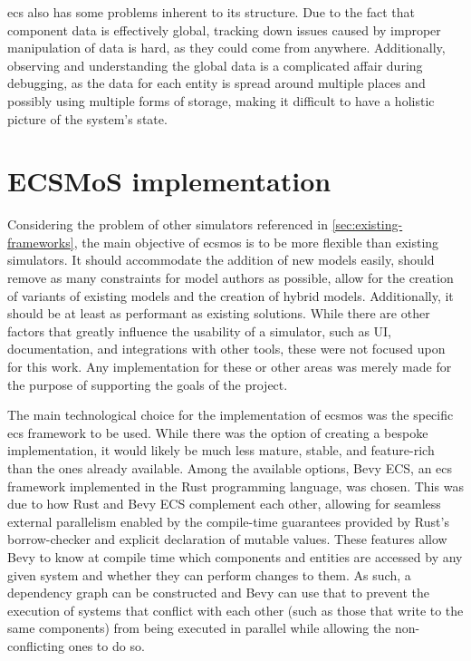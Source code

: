 \documentclass[twoside, 11pt]{article}
\begin{document}
\gls{ecs} also has some problems inherent to its structure. Due to the fact that component data is effectively global, tracking down issues caused by improper manipulation of data is hard, as they could come from anywhere. Additionally, observing and understanding the global data is a complicated affair during debugging, as the data for each entity is spread around multiple places and possibly using multiple forms of storage, making it difficult to have a holistic picture of the system's state.


\section{ECSMoS implementation} \label{sec:ecsmos-implementation}

Considering the problem of other simulators referenced in \autoref{sec:existing-frameworks}, the main objective of \gls{ecsmos} is to be more flexible than existing simulators. It should accommodate the addition of new models easily, should remove as many constraints for model authors as possible, allow for the creation of variants of existing models and the creation of hybrid models. Additionally, it should be at least as performant as existing solutions. While there are other factors that greatly influence the usability of a simulator, such as UI, documentation, and integrations with other tools, these were not focused upon for this work. Any implementation for these or other areas was merely made for the purpose of supporting the goals of the project.

The main technological choice for the implementation of \gls{ecsmos} was the specific \gls{ecs} framework to be used. While there was the option of creating a bespoke implementation, it would likely be much less mature, stable, and feature-rich than the ones already available. Among the available options, Bevy ECS, an \gls{ecs} framework implemented in the Rust programming language, was chosen. This was due to how Rust and Bevy ECS complement each other, allowing for seamless external parallelism enabled by the compile-time guarantees provided by Rust's borrow-checker and explicit declaration of mutable values. These features allow Bevy to know at compile time which components and entities are accessed by any given system and whether they can perform changes to them. As such, a dependency graph can be constructed and Bevy can use that to prevent the execution of systems that conflict with each other (such as those that write to the same components) from being executed in parallel while allowing the non-conflicting ones to do so.
\end{document}
